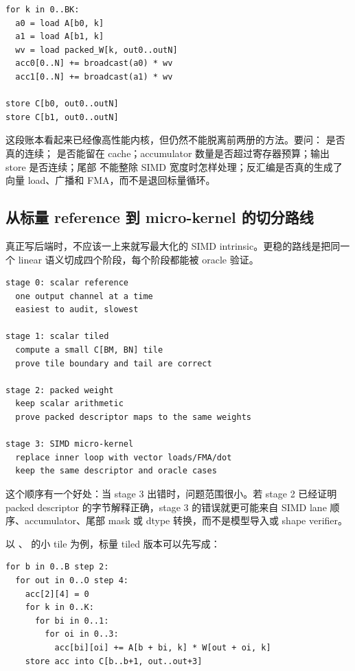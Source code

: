 \begin{lstlisting}[numbers=none,caption={一个抽象 micro-kernel 账本}]
for k in 0..BK:
  a0 = load A[b0, k]
  a1 = load A[b1, k]
  wv = load packed_W[k, out0..outN]
  acc0[0..N] += broadcast(a0) * wv
  acc1[0..N] += broadcast(a1) * wv

store C[b0, out0..outN]
store C[b1, out0..outN]
\end{lstlisting}

这段账本看起来已经像高性能内核，但仍然不能脱离前两册的方法。要问： 是否真的连续； 是否能留在 cache；accumulator 数量是否超过寄存器预算；输出 store 是否连续；尾部  不能整除 SIMD 宽度时怎样处理；反汇编是否真的生成了向量 load、广播和 FMA，而不是退回标量循环。

\subsection{从标量 reference 到 micro-kernel 的切分路线}

真正写后端时，不应该一上来就写最大化的 SIMD intrinsic。更稳的路线是把同一个 linear 语义切成四个阶段，每个阶段都能被 oracle 验证。

\begin{lstlisting}[numbers=none,caption={linear 内核的四阶段演进}]
stage 0: scalar reference
  one output channel at a time
  easiest to audit, slowest

stage 1: scalar tiled
  compute a small C[BM, BN] tile
  prove tile boundary and tail are correct

stage 2: packed weight
  keep scalar arithmetic
  prove packed descriptor maps to the same weights

stage 3: SIMD micro-kernel
  replace inner loop with vector loads/FMA/dot
  keep the same descriptor and oracle cases
\end{lstlisting}

这个顺序有一个好处：当 stage 3 出错时，问题范围很小。若 stage 2 已经证明 packed descriptor 的字节解释正确，stage 3 的错误就更可能来自 SIMD lane 顺序、accumulator、尾部 mask 或 dtype 转换，而不是模型导入或 shape verifier。

以 、 的小 tile 为例，标量 tiled 版本可以先写成：

\begin{lstlisting}[numbers=none,caption={标量 tiled GEMM 的参考形态}]
for b in 0..B step 2:
  for out in 0..O step 4:
    acc[2][4] = 0
    for k in 0..K:
      for bi in 0..1:
        for oi in 0..3:
          acc[bi][oi] += A[b + bi, k] * W[out + oi, k]
    store acc into C[b..b+1, out..out+3]
\end{lstlisting}

